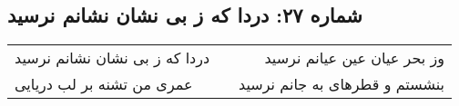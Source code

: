 \begin{center}
\section*{شماره ۲۷: دردا که ز بی نشان نشانم نرسید}
\label{sec:027}
\begin{longtable}{l p{0.5cm} r}
دردا که ز بی نشان نشانم نرسید
&&
وز بحر عیان عین عیانم نرسید
\\
عمری من تشنه بر لب دریایی
&&
بنشستم و قطرهای به جانم نرسید
\\
\end{longtable}
\end{center}
